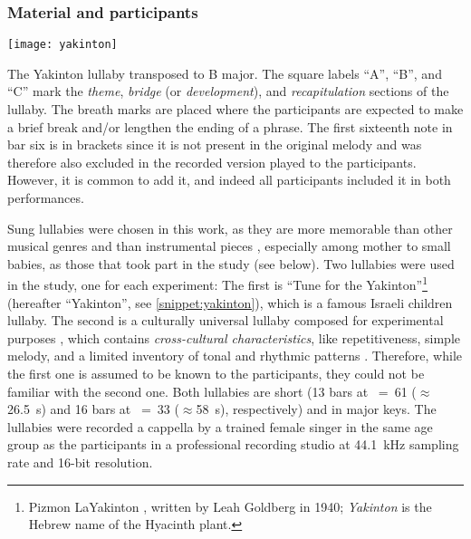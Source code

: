 \subsubsection{Material and participants}
\label{subsubsec:material_participants_music}

\begin{snippet}[t]
	\centering
	\texttt{[image: yakinton]}
	\caption[Yakinton lullaby]
		{The Yakinton lullaby transposed to B major.
		The square labels \enquote{A}, \enquote{B}, and \enquote{C} mark the \emph{theme}, \emph{bridge} (or \emph{development}), and \emph{recapitulation} sections of the lullaby.
		The breath marks are placed where the participants are expected to make a brief break and/or lengthen the ending of a phrase.
		The first sixteenth note in bar six is in brackets since it is not present in the original melody and was therefore also excluded in the recorded version played to the participants.
		However, it is common to add it, and indeed all participants included it in both performances.}
	\label{snippet:yakinton}
\end{snippet}
%
Sung lullabies were chosen in this work, as they are more memorable than other musical genres and than instrumental pieces \citep{Weiss2012something, Trehub1991music}, especially among mother to small babies, as those that took part in the study (see below).
Two lullabies were used in the study, one for each experiment: The first is \enquote{Tune for the Yakinton}\footnote{Pizmon LaYakinton
, written by Leah Goldberg in 1940; \emph{Yakinton} is the Hebrew name of the Hyacinth plant.} (hereafter \enquote{Yakinton}, see \cref{snippet:yakinton}), which is a famous Israeli children lullaby.
The second is a culturally universal lullaby composed for experimental purposes \citep[][pp.~22-47, and see \cref{snippet:uni-lullaby}]{Twig2016universal}, which contains \emph{cross-cultural characteristics}, like repetitiveness, simple melody, and a limited inventory of tonal and rhythmic patterns \citep{Unyk1992lullabies, Trehub1993maternal}.
Therefore, while the first one is assumed to be known to the participants, they could not be familiar with the second one.
Both lullabies are short (13 bars at \musQuarter~=~61 ($\approx$\SI{26.5}{\second}) and 16 bars at \musQuarterDotted~=~33 ($\approx$\SI{58}{\second}), respectively) and in major keys.
The lullabies were recorded a cappella by a trained female singer in the same age group as the participants in a professional recording studio at \SI{44.1}{\kilo\hertz} sampling rate and 16-bit resolution.
